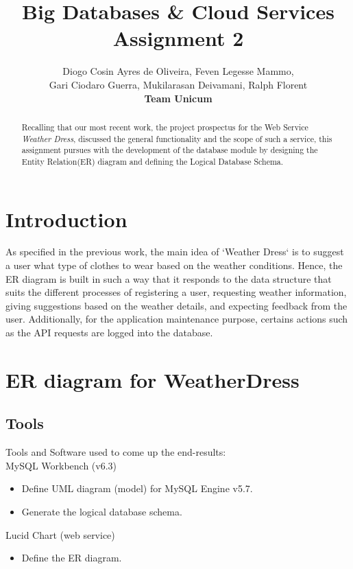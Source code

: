 \documentclass[]{article}
\title{Big Databases \& Cloud Services Assignment 2}
\author{Diogo Cosin Ayres de Oliveira, Feven Legesse Mammo,\\ Gari Ciodaro Guerra, Mukilarasan Deivamani, Ralph Florent\\ \textbf{Team Unicum}}
\begin{document}
\maketitle

\begin{abstract}
Recalling that our most recent work, the project prospectus for the Web Service \textit{Weather Dress}, discussed the general functionality and the scope of such a service, this assignment pursues with the development of the database module by designing the Entity Relation(ER) diagram and defining the Logical Database Schema. 
\end{abstract}


\section{Introduction}
As specified in the previous work, the main idea of `Weather Dress` is to suggest a user what type of clothes to wear based on the weather conditions. Hence, the ER diagram is built in such a way that it responds to the data structure that suits the different processes of registering a user, requesting weather information, giving suggestions based on the weather details, and expecting feedback from the user. Additionally, for the application maintenance purpose, certains actions such as the API requests are logged into the database.

\section{ER diagram for WeatherDress}

\subsection{Tools}
Tools and Software used to come up the end-results:\\

MySQL Workbench (v6.3)
\begin{itemize}
	\item Define UML diagram (model) for MySQL Engine v5.7.
	\item Generate the logical database schema.
\end{itemize}

Lucid Chart (web service)
\begin{itemize}
	\item Define the ER diagram.
\end{itemize}
\end{document}
